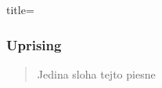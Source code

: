 \begin{song}{title=\subsubsection{Uprising}}
\begin{verse}
Jedina sloha tejto piesne
\end{verse}
\end{song}